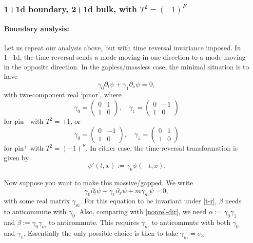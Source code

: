 \documentclass[12pt]{article}
\numberwithin{equation}{section}
\numberwithin{figure}{section}
\theoremstyle{remark}
\begin{document}
\subsubsection{1+1d boundary, 2+1d bulk, with $T^2=(-1)^F$}
\paragraph{Boundary analysis:}
Let us repeat our analysis above, but with time reversal invariance imposed. 
In 1+1d, the time reversal sends a mode moving in one direction to a mode moving in the opposite direction. 
In the gapless/massless case,
the minimal situation is to have \begin{equation}
\gamma_0 \partial_t \psi + \gamma_1 \partial_x \psi =0,
\end{equation} with two-component real `pinor', where \begin{equation}
\gamma_0 = \begin{pmatrix}
0 & 1\\
1& 0
\end{pmatrix},\quad
\gamma_1 = \begin{pmatrix}
0 & -1\\
1& 0
\end{pmatrix}
\label{2dpin-}
\end{equation} for pin$^-$ with $T^2=+1$, or \begin{equation}
\gamma_0 = \begin{pmatrix}
0 & -1\\
1& 0
\end{pmatrix},\quad
\gamma_1 = \begin{pmatrix}
0 & 1\\
1& 0
\end{pmatrix}
\label{2dpin+}
\end{equation} for pin$^+$ with $T^2=(-1)^F$. In either case, the time-reversal transformation is given by \begin{equation}
\psi'(t,x) := \gamma_0 \psi(-t,x).\label{t-r}
\end{equation}

Now suppose you want to make this massive/gapped. 
We write \begin{equation}
\gamma_0 \partial_t \psi + \gamma_1 \partial_x \psi + m\gamma_m\psi=0,
\end{equation} with some real matrix $\gamma_m$.
For this equation to be invariant under \eqref{t-r}, $\beta$ needs to anticommute with $\gamma_0$.
Also, comparing with \eqref{nonrel-dir}, 
we need $\alpha:=\gamma_0\gamma_1$ and $\beta:=\gamma_0\gamma_m$ to anticommute. 
This requires $\gamma_m$ to anticommute with both $\gamma_0$ and $\gamma_1$.
Essentially the only possible choice is then to take $\gamma_m=\sigma_3$.
\end{document}
